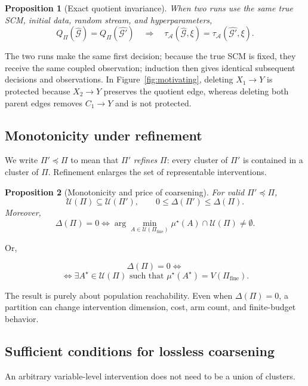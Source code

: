\documentclass[twoside]{article}
\newtheorem{proposition}{Proposition}
\begin{document}
\begin{proposition}[Exact quotient invariance]
\label{prop:contract}
When two runs use the same true SCM, initial data, random stream, and
hyperparameters,
\[
  Q_\Pi(\widehat{\mathcal G})=Q_\Pi(\widehat{\mathcal G'})
  \quad\Longrightarrow\quad
  \tau_{\mathcal A}(\widehat{\mathcal G},\xi)
  =
  \tau_{\mathcal A}(\widehat{\mathcal G'}, \xi).
\]
\end{proposition}

The two runs make the same first decision; because the true SCM is fixed, they receive the same coupled observation; induction then gives identical subsequent decisions and observations. In Figure~\ref{fig:motivating}, deleting $X_1\to Y$ is protected because $X_2\to Y$ preserves the quotient edge, whereas deleting both parent edges removes $C_1\to Y$ and is not protected.

\subsection{Monotonicity under refinement}
\label{sec:price}

We write $\Pi'\preceq\Pi$ to mean that $\Pi'$ \emph{refines} $\Pi$: every cluster of $\Pi'$ is contained in a cluster of $\Pi$. Refinement enlarges the set of representable interventions.

\begin{proposition}[Monotonicity and price of coarsening]
\label{prop:price}
For valid $\Pi'\preceq\Pi$,
\[
 \mathcal U(\Pi)\subseteq\mathcal U(\Pi'),
 \qquad
 0\le\Delta(\Pi')\le\Delta(\Pi).
\]
Moreover,
\[
 \Delta(\Pi)=0
 \iff
 \arg\min_{A\in\mathcal U(\Pi_{\mathrm{fine}})}\mu^\star(A)
 \cap\mathcal U(\Pi)\ne\emptyset.
\]
\end{proposition}

Or,

\[
\Delta(\Pi)=0
\iff 
\]
\[\iff \exists A^\star\in\mathcal U(\Pi)
\text{ such that }
\mu^\star(A^\star)=V(\Pi_{\mathrm{fine}}).
\]


The result is purely about population reachability. Even when $\Delta(\Pi)=0$, a partition can change intervention dimension, cost, arm count, and finite-budget behavior.

\subsection{Sufficient conditions for lossless coarsening}
\label{sec:zero-price}

An arbitrary variable-level intervention does not need to be a union of clusters. 
\end{document}
